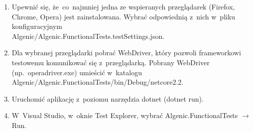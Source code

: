 \documentclass{article}
\begin{document}
\begin{enumerate}
    \item Upewnić się, że~co~najmniej jedna ze wspieranych przeglądarek (Firefox, Chrome, Opera) jest zainstalowana. Wybrać odpowiednią z~nich w~pliku konfiguracyjnym\\Algenic/Algenic.FunctionalTests.testSettings.json.
    \item Dla wybranej przeglądarki pobrać WebDriver, który pozwoli frameworkowi testowemu komunikować się z~przeglądarką. Pobrany WebDriver (np.~operadriver.exe) umieścić w~katalogu Algenic/Algenic.FunctionalTests/bin/Debug/netcore2.2.
    \item Uruchomić aplikację z~poziomu narzędzia dotnet (dotnet run).
    \item W~Visual Studio, w~oknie Test Explorer, wybrać Algenic.FunctionalTests $\rightarrow$ Run.
\end{enumerate}
\end{document}
